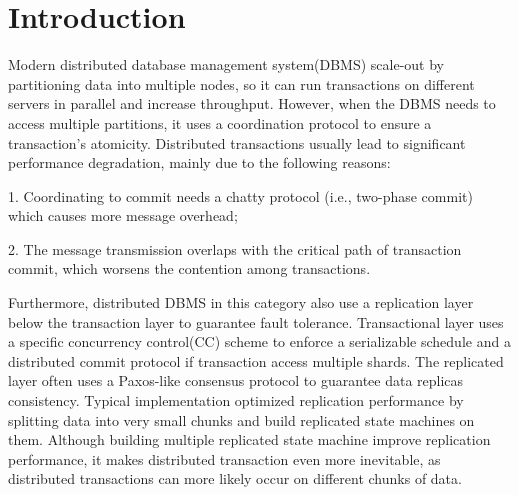\documentclass[conference]{IEEEtran}
\begin{document}
\section{Introduction}

Modern distributed
database management system(DBMS)  scale-out by partitioning data into multiple nodes, so it can run transactions on different servers in parallel and increase throughput.
However, when the DBMS needs to access multiple partitions, it uses a coordination protocol to ensure a transaction's atomicity.
Distributed transactions usually lead to significant performance degradation, mainly due to the following reasons\cite{Calvin:conf/sigmod/ThomsonDWRSA12}:

1. Coordinating to commit needs a chatty protocol (i.e., two-phase commit) which causes more message overhead;

2. The message transmission overlaps with the critical path of transaction commit, which worsens the contention among transactions.

Furthermore, distributed DBMS in this category also use a replication layer below the transaction layer to guarantee fault tolerance.
Transactional layer uses a specific concurrency control(CC) scheme to enforce a serializable schedule and a distributed commit protocol if transaction access multiple shards.
The replicated layer often uses a Paxos-like consensus protocol to guarantee data replicas consistency.
Typical implementation optimized replication performance by splitting data into very small chunks and build replicated state machines on them.
Although building multiple replicated state machine improve replication performance, it makes distributed transaction even more inevitable,
as distributed transactions can more likely occur on different chunks of data.
\end{document}
